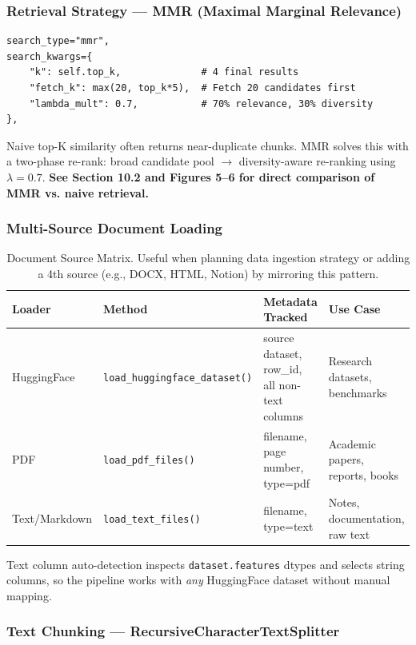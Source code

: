 \documentclass[12pt,a4paper]{article}
\begin{document}
\subsubsection{Retrieval Strategy — MMR (Maximal Marginal Relevance)}

\begin{lstlisting}
search_type="mmr",
search_kwargs={
    "k": self.top_k,              # 4 final results
    "fetch_k": max(20, top_k*5),  # Fetch 20 candidates first
    "lambda_mult": 0.7,           # 70% relevance, 30% diversity
},
\end{lstlisting}

Naive top-K similarity often returns near-duplicate chunks. MMR solves this with a two-phase re-rank: broad candidate pool $\to$ diversity-aware re-ranking using $\lambda=0.7$. \textbf{See Section 10.2 and Figures 5--6 for direct comparison of MMR vs. naive retrieval.}

\newpage

\subsubsection{Multi-Source Document Loading}

\begin{table}[H]
\centering
\footnotesize
\begin{tabular}{@{}lllp{4cm}@{}}
\toprule
\textbf{Loader} & \textbf{Method} & \textbf{Metadata Tracked} & \textbf{Use Case} \\
\midrule
HuggingFace & \texttt{load\_huggingface\_dataset()} & source dataset, row\_id, all non-text columns & Research datasets, benchmarks \\
PDF & \texttt{load\_pdf\_files()} & filename, page number, type=pdf & Academic papers, reports, books \\
Text/Markdown & \texttt{load\_text\_files()} & filename, type=text & Notes, documentation, raw text \\
\bottomrule
\end{tabular}
\caption{Document Source Matrix. Useful when planning data ingestion strategy or adding a 4th source (e.g., DOCX, HTML, Notion) by mirroring this pattern.}
\end{table}

Text column auto-detection inspects \texttt{dataset.features} dtypes and selects string columns, so the pipeline works with \textit{any} HuggingFace dataset without manual mapping.

\subsubsection{Text Chunking — RecursiveCharacterTextSplitter}
\end{document}
